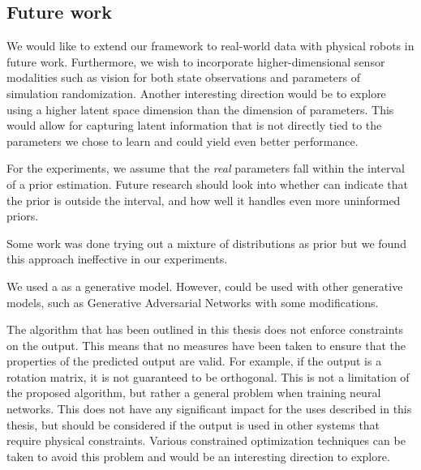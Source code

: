 \subsection{Future work}
We would like to extend our framework to real-world data with physical robots in future work. Furthermore, we wish to incorporate higher-dimensional sensor modalities such as vision for both state observations and parameters of simulation randomization.
Another interesting direction would be to explore using a higher latent space dimension than the dimension of parameters. This would allow for capturing latent information that is not directly tied to the parameters we chose to learn and could yield even better performance.

For the experiments, we assume that the \textit{real} parameters fall within the interval of a prior estimation. Future research should look into whether \dettostoc{} can indicate that the prior is outside the interval, and how well it handles even more uninformed priors.

Some work was done trying out a mixture of distributions as prior \parencite{DBLP:journals/corr/DilokthanakulMG16} but we found this approach ineffective in our experiments.

We used a \cvae{} as a generative model. However, \dettostoc{} could be used with other generative models, such as Generative Adversarial Networks \parencite{goodfellow2014} with some modifications.

The \dettostoc{} algorithm that has been outlined in this thesis does not enforce constraints on the output. This means that no measures have been taken to ensure that the properties of the predicted output are valid. For example, if the output is a rotation matrix, it is not guaranteed to be orthogonal. This is not a limitation of the proposed \dettostoc{} algorithm, but rather a general problem when training neural networks. This does not have any significant impact for the uses described in this thesis, but should be considered if the output is used in other systems that require physical constraints. Various constrained optimization techniques can be taken to avoid this problem and would be an interesting direction to explore. %